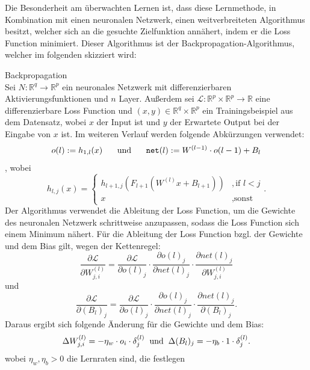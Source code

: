 \documentclass[12pt,letterpaper,ngerman]{article}
\begin{document}
\pagebreak
Die Besonderheit am überwachten Lernen ist, dass diese 
Lernmethode, in Kombination mit einen neuronalen Netzwerk,
einen weitverbreiteten Algorithmus besitzt, welcher
sich an die gesuchte Zielfunktion annähert,
indem er die Loss Function minimiert. Dieser Algorithmus 
ist der Backpropagation-Algorithmus, welcher im folgenden 
skizziert wird:
\begin{definition}{Backpropagation}
  \\
  Sei $N: \mathbb{R}^q \to \mathbb{R}^p$ ein neuronales Netzwerk 
  mit differenzierbaren Aktivierungsfunktionen und $n$ Layer.
  Außerdem sei
  $\mathcal{L}: \mathbb{R}^p \times \mathbb{R}^p \to \mathbb{R}$
  eine differenzierbare Loss Function und
  $(x,y)\in \mathbb{R}^q \times \mathbb{R}^p $ ein Trainingsbeispiel
  aus dem Datensatz, wobei $x$ der Input ist und $y$ der Erwartete
  Output bei der Eingabe von $x$ ist.
  Im weiteren Verlauf werden folgende Abkürzungen verwendet:
  \[
    o(l) := h_{1,l}(x) \hspace{0.5cm}\text{ und } \hspace{0.5cm}
    \texttt{net}(l) := W^{(l-1)}\cdot o(l-1) + B_l
  \],
  wobei
  \[
    h_{l,j}(x) = 
      \begin{cases}
        h_{l+1,j}(F_{l+1}(W^{(l)}x + B_{l+1}))& ,  \text{if } l < j  \\
        x & , \text{sonst}
      \end{cases}.
  \]
  Der Algorithmus verwendet die Ableitung der Loss Function, um
  die Gewichte des neuronalen Netzwerk schrittweise anzupassen,
  sodass die Loss Function sich einem Minimum nähert. Für die 
  Ableitung der Loss Function bzgl. der Gewichte und dem Bias 
  gilt, wegen der Kettenregel:
    \[
      \frac{\partial \mathcal{L}}{\partial W_{j,i}^{(l)}} = 
      \frac{\partial \mathcal{L}}{\partial o(l)_j} \cdot
        \frac{\partial o(l)_j}{\partial net(l)_j} \cdot
        \frac{\partial net(l)_j}{\partial W_{j,i}^{(l)}}
    \]
    und 
    \[
      \frac{\partial \mathcal{L}}{\partial (B_l)_j} = 
      \frac{\partial \mathcal{L}}{\partial o(l)_j} \cdot
        \frac{\partial o(l)_j}{\partial net(l)_j} \cdot
        \frac{\partial net(l)_j}{\partial (B_l)_{j}}.
    \]
    Daraus ergibt sich folgende Änderung für die Gewichte 
    und dem Bias:
    \[ \Delta W_{j,i}^{(l)} = -\eta_w \cdot o_i  \cdot \delta_j^{(l)}
      \hspace{0.2cm}
      \text{und}
      \hspace{0.2cm}
     \Delta (B_l)_j = -\eta_b \cdot 1 \cdot \delta_j^{(l)}. \]
    wobei $\eta_w, \eta_b > 0$ die Lernraten sind, die festlegen

\end{definition}
\end{document}
